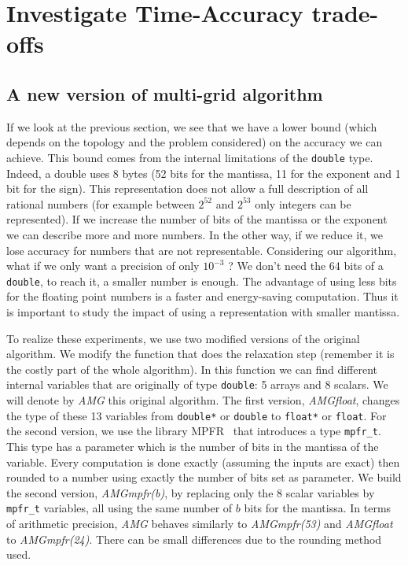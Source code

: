 \documentclass[10pt,conference]{IEEEtran}
\begin{document}
\section{Investigate Time-Accuracy trade-offs}
   
   \subsection{A new version of multi-grid algorithm}
   If we look at the previous section, we see that we have a lower bound (which depends on the topology and the problem considered) on the accuracy we can achieve. This bound comes from the internal limitations of the \texttt{double} type.
   Indeed, a double uses 8 bytes (52 bits for the mantissa, 11 for the exponent and 1 bit for the sign). This representation does not allow a full description of all rational numbers (for example between $2^{52}$ and $2^{53}$ only integers can be represented).
   If we increase the number of bits of the mantissa or the exponent we can describe more and more numbers. In the other way, if we reduce it, we lose accuracy for numbers that are not representable. Considering our algorithm, what if we only want
   a precision of only $10^{-3}$ ? We don't need the 64 bits of a \texttt{double}, to reach it, a smaller number is enough. The advantage of using less bits for the floating point numbers is a faster and energy-saving computation. Thus it is important
   to study the impact of using a representation with smaller mantissa.
   
   To realize these experiments, we use two modified versions of the original algorithm. We modify the function that does the relaxation step (remember it is the costly part of the whole algorithm).
   In this function we can find different internal variables that are originally of type \texttt{double}: 5 arrays and 8 scalars. We will denote by \emph{AMG} this original algorithm. The first version, \emph{AMGfloat}, changes the type of these 13 variables from \texttt{double*} or \texttt{double}
   to \texttt{float*} or \texttt{float}. For the second version, we use the library MPFR~\cite{MPFR,MPFR_link} that introduces a type \texttt{mpfr\_t}. This type has a parameter which is the number of bits in the mantissa of the variable.
   Every computation is done exactly (assuming the inputs are exact) then rounded to a number using exactly the number of bits set as parameter. We build the second version, \emph{AMGmpfr(b)}, by replacing only the 8 scalar variables
   by \texttt{mpfr\_t} variables, all using the same number of $b$ bits for the mantissa. In terms of arithmetic precision, \emph{AMG} behaves similarly to \emph{AMGmpfr(53)} and \emph{AMGfloat} to \emph{AMGmpfr(24)}. There can be small differences
   due to the rounding method used.
   
\end{document}
